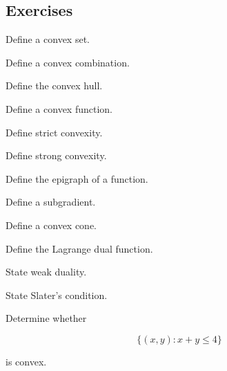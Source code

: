 \subsection{Exercises}
\label{subsec:convex-optimization-exercises}

\begin{exercise}[1]
Define a convex set.
\end{exercise}

\begin{exercise}[1]
Define a convex combination.
\end{exercise}

\begin{exercise}[1]
Define the convex hull.
\end{exercise}

\begin{exercise}[1]
Define a convex function.
\end{exercise}

\begin{exercise}[1]
Define strict convexity.
\end{exercise}

\begin{exercise}[1]
Define strong convexity.
\end{exercise}

\begin{exercise}[1]
Define the epigraph of a function.
\end{exercise}

\begin{exercise}[1]
Define a subgradient.
\end{exercise}

\begin{exercise}[1]
Define a convex cone.
\end{exercise}

\begin{exercise}[1]
Define the Lagrange dual function.
\end{exercise}

\begin{exercise}[1]
State weak duality.
\end{exercise}

\begin{exercise}[1]
State Slater's condition.
\end{exercise}

\begin{exercise}[2]
Determine whether

\[
\{
(x,y):
x+y\leq4
\}
\]

is convex.
\end{exercise}


